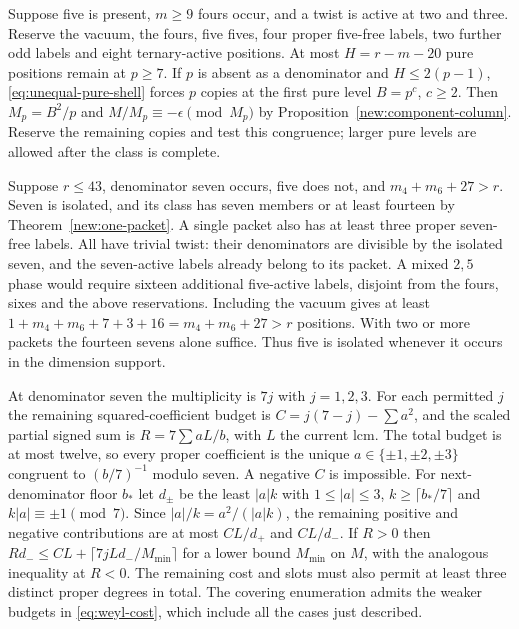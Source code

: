 \documentclass[11pt]{amsart}
\numberwithin{equation}{section}
\theoremstyle{definition}
\theoremstyle{plain}
\begin{document}
Suppose five is present, $m\ge9$ fours occur, and a twist is active
at two and three. Reserve the vacuum, the fours, five fives, four
proper five-free labels, two further odd labels and eight ternary-active
positions. At most $H=r-m-20$ pure positions remain at $p\ge7$.
If $p$ is absent as a denominator and $H\le2(p-1)$,
\eqref{eq:unequal-pure-shell} forces $p$ copies at the first pure
level $B=p^c$, $c\ge2$. Then $M_p=B^2/p$ and
$M/M_p\equiv-\epsilon\pmod{M_p}$ by Proposition~\ref{new:component-column}.
Reserve the remaining copies and test this congruence; larger pure
levels are allowed after the class is complete.

Suppose $r\le43$, denominator seven occurs, five does not, and
$m_4+m_6+27>r$. Seven is isolated, and its class has seven members
or at least fourteen by Theorem~\ref{new:one-packet}. A single packet also
has at least three proper seven-free labels. All have trivial twist:
their denominators are divisible by the isolated seven, and the
seven-active labels already belong to its packet. A mixed $2,5$
phase would require sixteen additional five-active labels, disjoint
from the fours, sixes and the above reservations. Including the
vacuum gives at least $1+m_4+m_6+7+3+16=m_4+m_6+27>r$ positions. With two or more
packets the fourteen sevens alone suffice. Thus five is isolated
whenever it occurs in the dimension support.

At denominator seven the multiplicity is $7j$ with $j=1,2,3$.
For each permitted $j$ the remaining squared-coefficient budget is
$C=j(7-j)-\sum a^2$, and the scaled partial signed sum is
$R=7\sum aL/b$, with $L$ the current lcm. The total budget is at most
twelve, so every proper coefficient is the unique $a\in\{\pm1,\pm2,\pm3\}$
congruent to $(b/7)^{-1}$ modulo seven. A negative $C$ is impossible.
For next-denominator floor $b_*$ let $d_\pm$ be the least $|a|k$ with
$1\le|a|\le3$, $k\ge\lceil b_*/7\rceil$ and $k|a|\equiv\pm1\pmod7$.
Since $|a|/k=a^2/(|a|k)$, the remaining positive and negative
contributions are at most $CL/d_+$ and $CL/d_-$. If $R>0$ then
$Rd_-\le CL+\lceil7jLd_-/M_{\min}\rceil$ for a lower bound $M_{\min}$
on $M$, with the analogous inequality at $R<0$. The remaining cost
and slots must also permit at least three distinct proper degrees in
total. The covering enumeration admits the weaker budgets in
\eqref{eq:weyl-cost}, which include all the cases just described.
\end{document}
